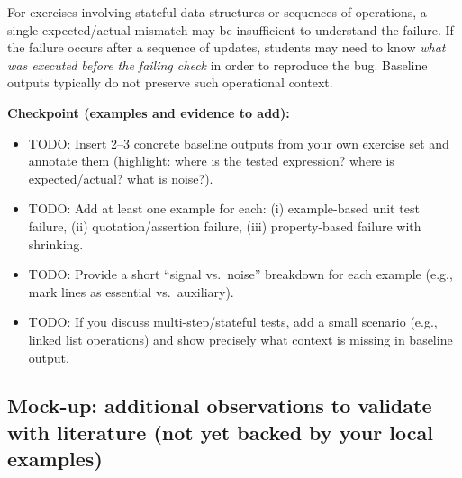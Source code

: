 \begin{justify}
For exercises involving stateful data structures or sequences of operations, a single
expected/actual mismatch may be insufficient to understand the failure. If the failure occurs after
a sequence of updates, students may need to know \emph{what was executed before the failing check}
in order to reproduce the bug. Baseline outputs typically do not preserve such operational context.

\skipM\textbf{Checkpoint (examples and evidence to add):}

\skipS\begin{itemize}
    \item TODO: Insert 2--3 concrete baseline outputs from your own exercise set and annotate them
        (highlight: where is the tested expression? where is expected/actual? what is noise?).
    \item TODO: Add at least one example for each: (i) example-based unit test failure, (ii)
        quotation/assertion failure, (iii) property-based failure with shrinking.
    \item TODO: Provide a short ``signal vs.\ noise'' breakdown for each example (e.g., mark lines
        as essential vs.\ auxiliary).
    \item TODO: If you discuss multi-step/stateful tests, add a small scenario (e.g., linked list
        operations) and show precisely what context is missing in baseline output.
\end{itemize}
\end{justify}


\subsection{Mock-up: additional observations to validate with literature (not yet backed by your local examples)}
     \label{Mock-up: additional observations to validate with literature (not yet backed by your local examples)}


